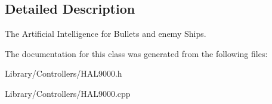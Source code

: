 \subsection{Detailed Description}
The Artificial Intelligence for Bullets and enemy Ships. 

The documentation for this class was generated from the following files\+:\begin{DoxyCompactItemize}
\item 
Library/\+Controllers/H\+A\+L9000.\+h\item 
Library/\+Controllers/H\+A\+L9000.\+cpp\end{DoxyCompactItemize}
